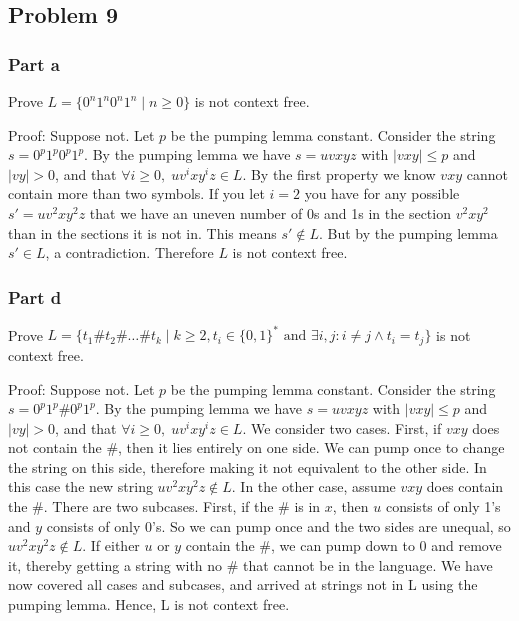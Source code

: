 \documentclass[english]{article}
\begin{document}
\subsection*{Problem 9}
\subsubsection*{Part a}
Prove \(L = \{0^n 1^n 0^n 1^n \mid n \ge 0\}\) is not context free.

Proof: Suppose not. Let $p$ be the pumping lemma constant. Consider the string $s = 0^p 1^p 0^p 1^p$. By the pumping lemma
we have $s = uvxyz$ with $|vxy| \le p$ and $|vy| > 0$, and that \(\forall i \ge 0,\; uv^ixy^iz \in L\). By the first property
we know $vxy$ cannot contain more than two symbols. If you let $i=2$ you have for any possible $s' = uv^2xy^2z$ that we have
an uneven number of 0s and 1s in the section $v^2xy^2$ than in the sections it is not in. This means $s' \notin L$.
But by the pumping lemma $s' \in L$, a contradiction. Therefore $L$ is not context free.

\subsubsection*{Part d}
Prove \(L = \{t_1\#t_2\#\ldots\#t_k \mid k \ge 2, t_i \in \{0,1\}^* \textrm{ and } \exists i, j : i \neq j \land t_i = t_j \}\) is not context free.

Proof: Suppose not. Let $p$ be the pumping lemma constant. Consider the string $s = 0^p1^p \# 0^p1^p$. By the pumping lemma we have $s = uvxyz$ with $|vxy| \le p$ and $|vy| > 0$, and that \(\forall i \ge 0,\; uv^ixy^iz \in L\). We consider two cases. First, if $vxy$ does not contain the \#, then it lies entirely on one side. We can pump once to change the string on this side, therefore making it not equivalent to the other side. In this case the new string $uv^2xy^2z \notin L$. In the other case, assume $vxy$ does contain the \#. There are two subcases. First, if the \# is in $x$, then $u$ consists of only 1's and $y$ consists of only 0's. So we can pump once and the two sides are unequal, so $uv^2xy^2z \notin L$. If either $u$ or $y$ contain the \#, we can pump down to 0 and remove it, thereby getting a string with no \# that cannot be in the language. We have now covered all cases and subcases, and arrived at strings not in L using the pumping lemma. Hence, L is not context free.
\end{document}
